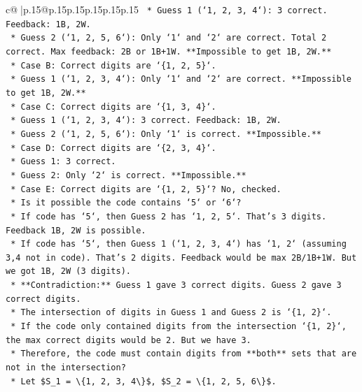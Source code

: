\documentclass{article}
\begin{document}
{\begin{supertabular}{c@{$\;$}|p{.15\linewidth}@{}p{.15\linewidth}p{.15\linewidth}p{.15\linewidth}p{.15\linewidth}p{.15\linewidth}}
{{{\texttt{            *   Guess 1 (`1, 2, 3, 4`): 3 correct. Feedback: 1B, 2W.} \\
\texttt{            *   Guess 2 (`1, 2, 5, 6`): Only `1` and `2` are correct. Total 2 correct. Max feedback: 2B or 1B+1W. **Impossible to get 1B, 2W.**} \\
\texttt{        *   Case B: Correct digits are `\{1, 2, 5\}`.} \\
\texttt{            *   Guess 1 (`1, 2, 3, 4`): Only `1` and `2` are correct. **Impossible to get 1B, 2W.**} \\
\texttt{        *   Case C: Correct digits are `\{1, 3, 4\}`.} \\
\texttt{            *   Guess 1 (`1, 2, 3, 4`): 3 correct. Feedback: 1B, 2W.} \\
\texttt{            *   Guess 2 (`1, 2, 5, 6`): Only `1` is correct. **Impossible.**} \\
\texttt{        *   Case D: Correct digits are `\{2, 3, 4\}`.} \\
\texttt{            *   Guess 1: 3 correct.} \\
\texttt{            *   Guess 2: Only `2` is correct. **Impossible.**} \\
\texttt{        *   Case E: Correct digits are `\{1, 2, 5\}`? No, checked.} \\
\texttt{        *   Is it possible the code contains `5` or `6`?} \\
\texttt{            *   If code has `5`, then Guess 2 has `1, 2, 5`. That's 3 digits. Feedback 1B, 2W is possible.} \\
\texttt{            *   If code has `5`, then Guess 1 (`1, 2, 3, 4`) has `1, 2` (assuming 3,4 not in code). That's 2 digits. Feedback would be max 2B/1B+1W. But we got 1B, 2W (3 digits).} \\
\texttt{            *   **Contradiction:** Guess 1 gave 3 correct digits. Guess 2 gave 3 correct digits.} \\
\texttt{            *   The intersection of digits in Guess 1 and Guess 2 is `\{1, 2\}`.} \\
\texttt{            *   If the code only contained digits from the intersection `\{1, 2\}`, the max correct digits would be 2. But we have 3.} \\
\texttt{            *   Therefore, the code must contain digits from **both** sets that are not in the intersection?} \\
\texttt{            *   Let \$S\_1 = \textbackslash{}\{1, 2, 3, 4\textbackslash{}\}\$, \$S\_2 = \textbackslash{}\{1, 2, 5, 6\textbackslash{}\}\$.} \\
}}}
\end{supertabular}}
\end{document}
